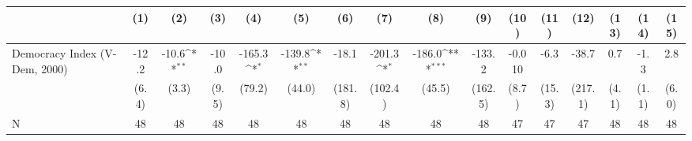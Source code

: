 {
\def\sym#1{\ifmmode^{#1}\else\(^{#1}\)\fi}
\begin{tabular}{l*{15}{c}}
\hline\hline
                    &\multicolumn{1}{c}{(1)}         &\multicolumn{1}{c}{(2)}         &\multicolumn{1}{c}{(3)}         &\multicolumn{1}{c}{(4)}         &\multicolumn{1}{c}{(5)}         &\multicolumn{1}{c}{(6)}         &\multicolumn{1}{c}{(7)}         &\multicolumn{1}{c}{(8)}         &\multicolumn{1}{c}{(9)}         &\multicolumn{1}{c}{(10)}         &\multicolumn{1}{c}{(11)}         &\multicolumn{1}{c}{(12)}         &\multicolumn{1}{c}{(13)}         &\multicolumn{1}{c}{(14)}         &\multicolumn{1}{c}{(15)}         \\
\hline
Democracy Index (V-Dem, 2000)&       -12.2         &       -10.6\sym{**} &       -10.0         &      -165.3\sym{*}  &      -139.8\sym{**} &       -18.1         &      -201.3\sym{*}  &      -186.0\sym{***}&      -133.2         &      -0.010         &        -6.3         &       -38.7         &         0.7         &        -1.3         &         2.8         \\
                    &       (6.4)         &       (3.3)         &       (9.5)         &      (79.2)         &      (44.0)         &     (181.8)         &     (102.4)         &      (45.5)         &     (162.5)         &       (8.7)         &      (15.3)         &     (217.1)         &       (4.1)         &       (1.1)         &       (6.0)         \\
\hline
N                   &          48         &          48         &          48         &          48         &          48         &          48         &          48         &          48         &          48         &          47         &          47         &          47         &          48         &          48         &          48         \\
\hline\hline
\end{tabular}
}

